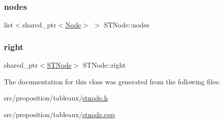 \mbox{\label{class_s_t_node_a370cb3b8a6bcd2e488a27d47be4e0920}} 
\subsubsection{\texorpdfstring{nodes}{nodes}}
{\footnotesize\ttfamily list$<$shared\+\_\+ptr$<$\hyperlink{class_node}{Node}$>$ $>$ S\+T\+Node\+::nodes}

\mbox{\label{class_s_t_node_a66d06118063fb739058f91c75b725e27}} 
\subsubsection{\texorpdfstring{right}{right}}
{\footnotesize\ttfamily shared\+\_\+ptr$<$\hyperlink{class_s_t_node}{S\+T\+Node}$>$ S\+T\+Node\+::right}



The documentation for this class was generated from the following files\+:\begin{DoxyCompactItemize}
\item 
src/proposition/tableaux/\hyperlink{stnode_8h}{stnode.\+h}\item 
src/proposition/tableaux/\hyperlink{stnode_8cpp}{stnode.\+cpp}\end{DoxyCompactItemize}
